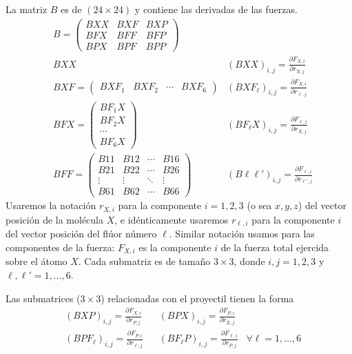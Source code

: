 La matriz $B$ es de $(24\times 24)$ y contiene las derivadas de las fuerzas.
%
\begin{subequations}
  \begin{align}
    \label{Q:Jacob-eq-dif-B}
&   B =
\begin{pmatrix}
  BXX & BXF & BXP \\
  BFX & BFF & BFP \\
  BPX & BPF & BPP 
\end{pmatrix}   \\ \label{Q:Jacob-eq-dif-BXX}
    & BXX  & (BXX)_{i,j} = \frac{\partial F_{X,i}}{\partial r_{X,j}}  \\
\label{Q:Jacob-eq-dif-BXF}    &BXF =  \begin{pmatrix}   BXF_{1} & BXF_{2} & \cdots & BXF_{6}   \end{pmatrix}
    & (BXF_{\ell})_{i,j}=  \frac{\partial F_{X,i}}{\partial r_{\ell,j}}\\
\label{Q:Jacob-eq-dif-BFX}    &BFX =  \begin{pmatrix}   BF_{1}X \\ BF_{2}X \\ \cdots \\ BF_{6}X   \end{pmatrix}
    & (BF_{\ell}X)_{i,j}=  \frac{\partial F_{\ell,i}}{\partial r_{X,j}} \\ 
\label{Q:Jacob-eq-dif-BFF}    &BFF =  \begin{pmatrix}
  B11 & B12 & \cdots & B16 \\
  B21 & B22 & \cdots & B26 \\
  \vdots  & \vdots  & \ddots & \vdots  \\
  B61 & B62 & \cdots & B66 
 \end{pmatrix} & (B\ell\ell')_{i,j}=  \frac{\partial F_{\ell,i}}{\partial r_{\ell',j}}
  \end{align}
\end{subequations}
Usaremos la notaci\'{o}n $r_{X,i}$ para la componente $i=1,2,3$ (o sea $x,y,z$) del vector posici\'{o}n de la mol\'{e}cula $X$, e id\'{e}nticamente usaremos $r_{\ell, i}$ para la componente $i$ del vector posici\'{o}n del fl\'{u}or n\'{u}mero $\ell$. Similar notaci\'{o}n usamos para las componentes de la fuerza: $F_{X,i}$ es la componente $i$ de la fuerza total ejercida sobre el \'{a}tomo $X$.
Cada submatriz es de tama\~{n}o $3 \times 3$, donde $i,j= 1,2,3$  y $\ell,\ell'=1, \dots, 6$.

Las submatrices ($3 \times 3$) relacionadas con el proyectil tienen la forma 
\begin{subequations}
  \begin{align}
 & (BXP)_{i,j} =  \frac{\partial F_{X,i}}{\partial r_{P,j}} &
 & (BPX)_{i,j} =  \frac{\partial F_{P,i}}{\partial r_{X,j}} \\
 & (BPF_{\ell})_{i,j}=  \frac{\partial F_{P,i}}{\partial r_{\ell,j}} &
 & (BF_{\ell}P)_{i,j}=  \frac{\partial F_{\ell,i}}{\partial r_{P,j}} & \forall \ell= 1, \dots, 6
  \end{align}
\end{subequations}

